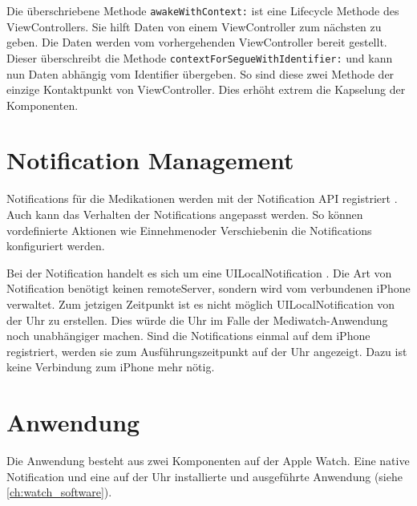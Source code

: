 Die überschriebene Methode \lstinline{awakeWithContext:} ist eine Lifecycle Methode des ViewControllers. Sie hilft Daten von einem ViewController zum nächsten zu geben. Die Daten werden vom vorhergehenden ViewController bereit gestellt. Dieser überschreibt die Methode \lstinline{contextForSegueWithIdentifier:} und kann nun Daten abhängig vom Identifier übergeben. So sind diese zwei Methode der einzige Kontaktpunkt von ViewController. Dies erhöht extrem die Kapselung der Komponenten.




\section{Notification Management}
Notifications für die Medikationen werden mit der Notification API  registriert \cite{Apple:2015notif}. Auch kann das Verhalten der Notifications angepasst werden. So können vordefinierte Aktionen wie \glqq Einnehmen\grqq  oder \glqq Verschieben\grqq in die Notifications konfiguriert werden.

Bei der Notification handelt es sich um eine UILocalNotification \cite{Apple:2015notif}. Die Art von Notification benötigt keinen \gls{remoteServer}, sondern wird vom verbundenen iPhone verwaltet. Zum jetzigen Zeitpunkt ist es nicht möglich UILocalNotification von der Uhr zu erstellen. Dies würde die Uhr im Falle der Mediwatch-Anwendung noch unabhängiger machen. Sind die Notifications einmal auf dem iPhone registriert, werden sie zum Ausführungszeitpunkt auf der Uhr angezeigt. Dazu ist keine Verbindung zum iPhone mehr nötig.

\section{Anwendung}

Die Anwendung besteht aus zwei Komponenten auf der Apple Watch. Eine native Notification  und eine auf der Uhr installierte und ausgeführte Anwendung (siehe \ref{ch:watch_software}).

